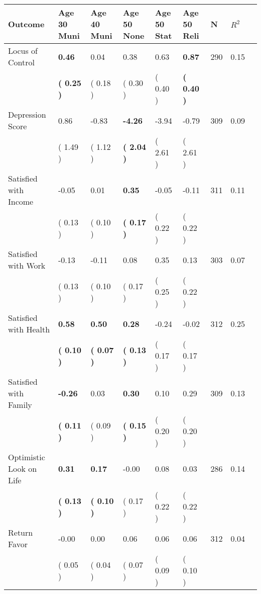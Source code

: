 \begin{tabular}{L{6.2cm} C{1.8cm} C{1.8cm} C{1.8cm} C{1.8cm} C{1.8cm} C{1.8cm} C{0.3cm} C{0.3cm}}
\toprule
 \textbf{Outcome} & \textbf{Age 30 Muni} & \textbf{Age 40 Muni} & \textbf{Age 50 None} & \textbf{Age 50 Stat} & \textbf{Age 50 Reli} & \textbf{N} & \textbf{$ R^2$} \\
\midrule
Locus of Control & \textbf{     0.46} &      0.04 &      0.38 &      0.63 & \textbf{     0.87}  & 290 &       0.15 \\ 
 & \textbf{(     0.25 )} & (     0.18 ) & (     0.30 ) & (     0.40 ) & \textbf{(     0.40 )}  & \\
Depression Score &      0.86 &     -0.83 & \textbf{    -4.26} &     -3.94 &     -0.79  & 309 &       0.09 \\ 
 & (     1.49 ) & (     1.12 ) & \textbf{(     2.04 )} & (     2.61 ) & (     2.61 )  & \\
Satisfied with Income &     -0.05 &      0.01 & \textbf{     0.35} &     -0.05 &     -0.11  & 311 &       0.11 \\ 
 & (     0.13 ) & (     0.10 ) & \textbf{(     0.17 )} & (     0.22 ) & (     0.22 )  & \\
Satisfied with Work &     -0.13 &     -0.11 &      0.08 &      0.35 &      0.13  & 303 &       0.07 \\ 
 & (     0.13 ) & (     0.10 ) & (     0.17 ) & (     0.25 ) & (     0.22 )  & \\
Satisfied with Health & \textbf{     0.58} & \textbf{     0.50} & \textbf{     0.28} &     -0.24 &     -0.02  & 312 &       0.25 \\ 
 & \textbf{(     0.10 )} & \textbf{(     0.07 )} & \textbf{(     0.13 )} & (     0.17 ) & (     0.17 )  & \\
Satisfied with Family & \textbf{    -0.26} &      0.03 & \textbf{     0.30} &      0.10 &      0.29  & 309 &       0.13 \\ 
 & \textbf{(     0.11 )} & (     0.09 ) & \textbf{(     0.15 )} & (     0.20 ) & (     0.20 )  & \\
Optimistic Look on Life & \textbf{     0.31} & \textbf{     0.17} &     -0.00 &      0.08 &      0.03  & 286 &       0.14 \\ 
 & \textbf{(     0.13 )} & \textbf{(     0.10 )} & (     0.17 ) & (     0.22 ) & (     0.22 )  & \\
Return Favor &     -0.00 &      0.00 &      0.06 &      0.06 &      0.06  & 312 &       0.04 \\ 
 & (     0.05 ) & (     0.04 ) & (     0.07 ) & (     0.09 ) & (     0.10 )  & \\

\end{tabular}
